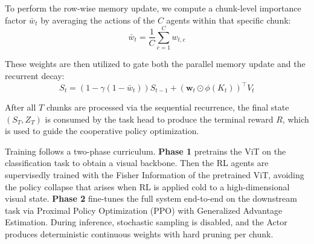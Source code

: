 To perform the row-wise memory update, we compute a chunk-level importance factor $\bar{w}_t$ by averaging the actions of the $C$ agents within that specific chunk:
\begin{equation}
	\bar{w}_t = \frac{1}{C}\sum_{c=1}^C w_{t,c}
\end{equation}

These weights are then utilized to gate both the parallel memory update and the recurrent decay:
\begin{equation}
	S_t = (1 - \gamma(1 - \bar{w}_t)) S_{t-1} + (\mathbf{w}_t \odot \phi(K_t))^\top V_t
\end{equation}

After all $T$ chunks are processed via the sequential recurrence, the final state $(S_T, Z_T)$ is consumed by the task head to produce the terminal reward $R$, which is used to guide the cooperative policy optimization.

Training follows a two-phase curriculum. \textbf{Phase 1} pretrains the ViT on the classification task to obtain a visual backbone. Then the RL agents are supervisedly trained with the Fisher Information of the pretrained ViT, avoiding the policy collapse that arises when RL is applied cold to a high-dimensional visual state. \textbf{Phase 2} fine-tunes the full system end-to-end on the downstream task via Proximal Policy Optimization (PPO) with Generalized Advantage Estimation. During inference, stochastic sampling is disabled, and the Actor produces deterministic continuous weights with hard pruning per chunk.

